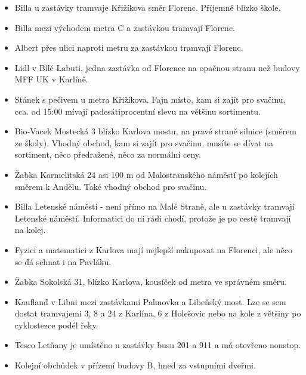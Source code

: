 \begin{itemize}
    \item Billa u zastávky tramvaje Křižíkova směr Florenc. Příjemně blízko škole.
    \item Billa mezi východem metra C a zastávkou tramvají Florenc.
    \item Albert přes ulici naproti metru za zastávkou tramvají Florenc.
    \item Lidl v Bílé Labuti, jedna zastávka od Florence na opačnou stranu než budovy MFF UK v Karlíně.
    \item Stánek s pečivem u metra Křižíkova. Fajn místo, kam si zajít pro svačinu, cca. od 15:00 mívají padesátiprocentní slevu na většinu sortimentu.
\end{itemize}

\begin{itemize}
    \item Bio-Vacek Mostecká 3 blízko Karlova mostu, na pravé straně silnice (směrem ze školy). Vhodný obchod, kam si zajít pro svačinu, musíte se dívat na sortiment, něco předražené, něco za normální ceny.
    \item Žabka Karmelitská 24 asi 100 m od Malostranského náměstí po kolejích směrem k Andělu. Také vhodný obchod pro svačinu.
    \item Billa Letenské náměstí - není přímo na Malé Straně, ale u zastávky tramvají Letenské náměstí. Informatici do ní rádi chodí, protože je po cestě tramvají na kolej.
\end{itemize}

\begin{itemize}
    \item Fyzici a matematici z Karlova mají nejlepší nakupovat na Florenci, ale něco se dá sehnat i na Pavláku.
    \item Žabka Sokolská 31, blízko Karlova, kousíček od metra ve správném směru.
\end{itemize}

\begin{itemize}
    \item Kaufland v Libni mezi zastávkami Palmovka a Libeňský most. Lze se sem dostat tramvajemi 3, 8 a 24 z Karlína, 6 z Holešovic nebo na kole z většiny po cyklostezce podél řeky.
    \item Tesco Letňany je umístěno u zastávky busu 201 a 911 a má otevřeno nonstop.
    \item Kolejní obchůdek v přízemí budovy B, hned za vstupními dveřmi.
\end{itemize}

